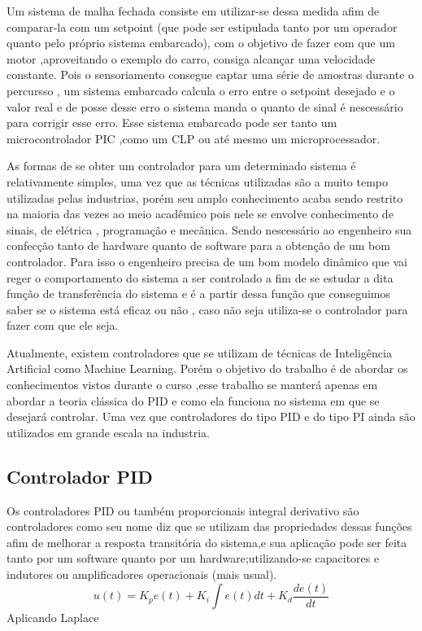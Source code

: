 \documentclass[11pt]{article}
\begin{document}
Um sistema de malha fechada consiste em utilizar-se dessa medida afim de comparar-la com um setpoint (que pode ser estipulada tanto por um operador quanto pelo próprio sistema embarcado), com o objetivo de fazer com que um motor ,aproveitando o exemplo do carro, consiga alcançar uma velocidade constante. Pois o sensoriamento consegue captar uma série de amostras durante o percursso , um sistema embarcado calcula o erro entre o setpoint desejado e o valor real e de posse desse erro o sistema manda o quanto de sinal é nescessário para corrigir esse erro. Esse sistema embarcado pode ser tanto um microcontrolador PIC ,como um CLP ou até mesmo um microprocessador.

As formas de se obter um controlador para um determinado sistema é relativamente simples, uma vez que as técnicas utilizadas são a muito tempo utilizadas pelas industrias, porém seu amplo conhecimento acaba sendo restrito na maioria das vezes ao meio acadêmico pois nele se envolve conhecimento de sinais, de elétrica , programação e mecânica. Sendo nescessário ao engenheiro sua confecção tanto de hardware quanto de software para a obtenção de um bom controlador. Para isso o engenheiro precisa de um bom modelo dinâmico que vai reger o comportamento do sistema a ser controlado a fim de se estudar a dita função de transferência do sistema e é a partir dessa função que conseguimos saber se o sistema está eficaz ou não , caso não seja utiliza-se o controlador para fazer com que ele seja.

Atualmente, existem controladores que se utilizam de técnicas de Inteligência Artificial como Machine Learning. Porém o objetivo do trabalho é de abordar os conhecimentos vistos durante o curso ,esse trabalho se manterá apenas em abordar a teoria clássica do PID e como ela funciona no sistema em que se desejará controlar. Uma vez que controladores do tipo PID e do tipo PI ainda são utilizados em grande escala na industria.

\subsection{Controlador PID}
Os controladores PID ou também proporcionais integral derivativo são controladores como seu nome diz que se utilizam das propriedades dessas funções afim de melhorar a resposta transitória do sistema,e sua aplicação pode ser feita tanto por um software quanto por um hardware;utilizando-se capacitores e indutores ou amplificadores operacionais (mais usual).
$$u(t)=K_p e(t)+K_i \int e(t)dt +K_d \frac{de(t)}{dt}$$
Aplicando Laplace 
\end{document}
